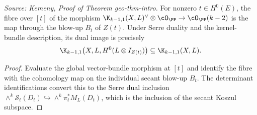 \begin{lemma}
  \label{lem:kemeny_fibre_secant_map}
  \textit{Source: Kemeny, Proof of Theorem geo-thm-intro.}
  For nonzero \(t\in H^0(E)\), the fibre over \([t]\) of the morphism
  \(\K_{k-1,1}(X,L)^\vee\otimes\cO_{\PP}\to\cO_{\PP}(k-2)\) is the map through
  the blow-up \(B_t\) of \(Z(t)\).  Under Serre duality and the kernel-bundle
  description, its dual image is precisely
  \[
    \K_{k-1,1}\bigl(X,L,H^0(L\otimes I_{Z(t)})\bigr)
    \subseteq \K_{k-1,1}(X,L).
  \]
\end{lemma}
\begin{proof}
  Evaluate the global vector-bundle morphism at \([t]\) and identify the fibre
  with the cohomology map on the individual secant blow-up \(B_t\).  The
  determinant identifications convert this to the Serre dual inclusion
  \(\wedge^k\mathcal S_t(D_t)\hookrightarrow\wedge^k\pi_t^*M_L(D_t)\), which is
  the inclusion of the secant Koszul subspace.
\end{proof}


